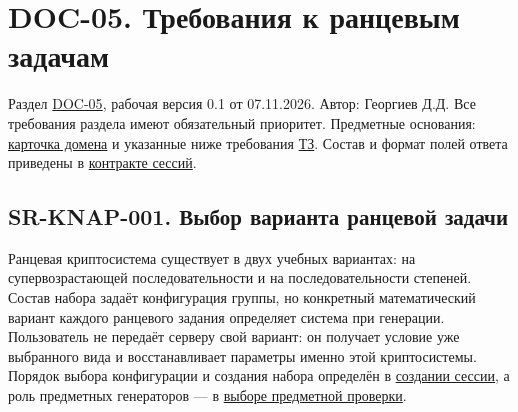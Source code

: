 \documentclass[12pt,a4paper]{article}
\begin{document}
\section{DOC-05. Требования к ранцевым задачам}\label{doc-05-ux442ux440ux435ux431ux43eux432ux430ux43dux438ux44f-ux43a-ux440ux430ux43dux446ux435ux432ux44bux43c-ux437ux430ux434ux430ux447ux430ux43c}

\hypertarget{doc-05-требования-к-ранцевым-задачам}{}

Раздел \hyperref[doc-05-ux441ux438ux441ux442ux435ux43cux43dux44bux435-ux442ux440ux435ux431ux43eux432ux430ux43dux438ux44f]{DOC-05}, рабочая версия 0.1 от 07.11.2026. Автор: Георгиев Д.Д. Все требования раздела имеют обязательный приоритет. Предметные основания: \href{https://github.com/Kokorev-VD/mephi-samolety/blob/main/notes/domains/backpack.md}{карточка домена} и указанные ниже требования \href{../02_\%D0\%A2\%D0\%B5\%D1\%85\%D0\%BD\%D0\%B8\%D1\%87\%D0\%B5\%D1\%81\%D0\%BA\%D0\%BE\%D0\%B5_\%D0\%B7\%D0\%B0\%D0\%B4\%D0\%B0\%D0\%BD\%D0\%B8\%D0\%B5/\%D0\%A2\%D0\%B5\%D1\%85\%D0\%BD\%D0\%B8\%D1\%87\%D0\%B5\%D1\%81\%D0\%BA\%D0\%BE\%D0\%B5_\%D0\%B7\%D0\%B0\%D0\%B4\%D0\%B0\%D0\%BD\%D0\%B8\%D0\%B5.pdf}{ТЗ}. Состав и формат полей ответа приведены в \href{../07_\%D0\%9F\%D1\%80\%D0\%BE\%D0\%B3\%D1\%80\%D0\%B0\%D0\%BC\%D0\%BC\%D0\%BD\%D1\%8B\%D0\%B5_\%D1\%82\%D1\%80\%D0\%B5\%D0\%B1\%D0\%BE\%D0\%B2\%D0\%B0\%D0\%BD\%D0\%B8\%D1\%8F/DOC-06.2_\%D0\%A1\%D0\%B5\%D1\%81\%D1\%81\%D0\%B8\%D0\%B8_\%D0\%B7\%D0\%B0\%D0\%B4\%D0\%B0\%D1\%87_\%D0\%B8_\%D0\%BF\%D0\%BB\%D0\%B0\%D0\%BD\%D0\%B8\%D1\%80\%D0\%BE\%D0\%B2\%D1\%89\%D0\%B8\%D0\%BA.pdf\#nameddest=\%D1\%80\%D0\%B0\%D0\%BD\%D1\%86\%D0\%B5\%D0\%B2\%D0\%B0\%D1\%8F-\%D0\%B7\%D0\%B0\%D0\%B4\%D0\%B0\%D1\%87\%D0\%B0}{контракте сессий}.

\subsection{SR-KNAP-001. Выбор варианта ранцевой задачи}\label{sr-knap-001-ux432ux44bux431ux43eux440-ux432ux430ux440ux438ux430ux43dux442ux430-ux440ux430ux43dux446ux435ux432ux43eux439-ux437ux430ux434ux430ux447ux438}

\hypertarget{sr-knap-001-выбор-варианта-ранцевой-задачи}{}

Ранцевая криптосистема существует в двух учебных вариантах: на супервозрастающей последовательности и на последовательности степеней. Состав набора задаёт конфигурация группы, но конкретный математический вариант каждого ранцевого задания определяет система при генерации. Пользователь не передаёт серверу свой вариант: он получает условие уже выбранного вида и восстанавливает параметры именно этой криптосистемы. Порядок выбора конфигурации и создания набора определён в \hyperref[sr-ses-001-ux441ux43eux437ux434ux430ux43dux438ux435-ux43dux430ux431ux43eux440ux430-ux43fux43e-ux43aux43eux43dux444ux438ux433ux443ux440ux430ux446ux438ux438-ux433ux440ux443ux43fux43fux44b]{создании сессии}, а роль предметных генераторов --- в \hyperref[sr-ses-004-ux432ux44bux431ux43eux440-ux43fux440ux435ux434ux43cux435ux442ux43dux43eux439-ux43fux440ux43eux432ux435ux440ux43aux438]{выборе предметной проверки}.
\end{document}

